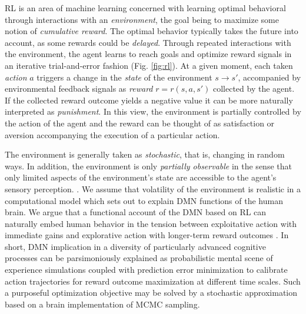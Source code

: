 \documentclass[10pt,letterpaper]{article}
\begin{document}
RL is an area of machine learning concerned with learning optimal behavioral through interactions
with an \textit{environment}, the goal being to maximize some notion of \textit{cumulative reward}.
The optimal behavior typically
takes the future into account, as some rewards could be \textit{delayed}.
Through repeated interactions with the environment,
the agent learns to reach goals and optimize reward signals
in an iterative trial-and-error fashion (Fig. \ref{fig:rl}).
At a given moment, each taken \textit{action} $a$ triggers a change
in the \textit{state} of the environment
$s \rightarrow s'$, accompanied by environmental feedback signals as \textit{reward}
$r = r(s, a,s')$ collected by the agent.
If the collected reward outcome yields a negative value it can be
more naturally interpreted as \textit{punishment}.
In this view, the environment is partially controlled by
the action of the agent and the reward can be thought
of as satisfaction \textemdash or aversion \textemdash accompanying the execution of
a particular action.

The environment is generally taken as \textit{stochastic},
that is, changing in random ways. In addition, the environment is only
\textit{partially observable} in the sense that only limited aspects of the environment's
state are accessible to the agent's sensory perception.
\citep{starkweather2017dopamine}.
We assume that volatility of the environment
is realistic in a computational model which sets out
to explain DMN functions of the human brain.
We argue that a functional account of the DMN based on RL
can naturally embed human behavior
in the tension between exploitative action with immediate gains and
explorative action with longer-term reward outcomes
\citep{dayan2008decision}.
In short, DMN implication in a diversity of
particularly advanced cognitive processes
can be parsimoniously explained as probabilistic mental
scene of experience simulations coupled with prediction error minimization
to calibrate action trajectories for
reward outcome maximization at different time scales.
Such a purposeful optimization objective
may be solved by a stochastic approximation
based on a brain implementation of MCMC sampling.
\end{document}

